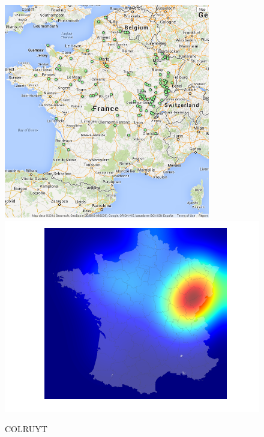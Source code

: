 \documentclass[11pt]{article}
\begin{document}
\begin{figure}[H]
    \caption{COLRUYT}
	\centering
		\includegraphics[width=9cm]{images/maps_group_dots/COLRUYT.png}
        \includegraphics[width=12.8cm]{images/maps_group_heatmaps/COLRUYT.png}
\end{figure}
\end{document}
